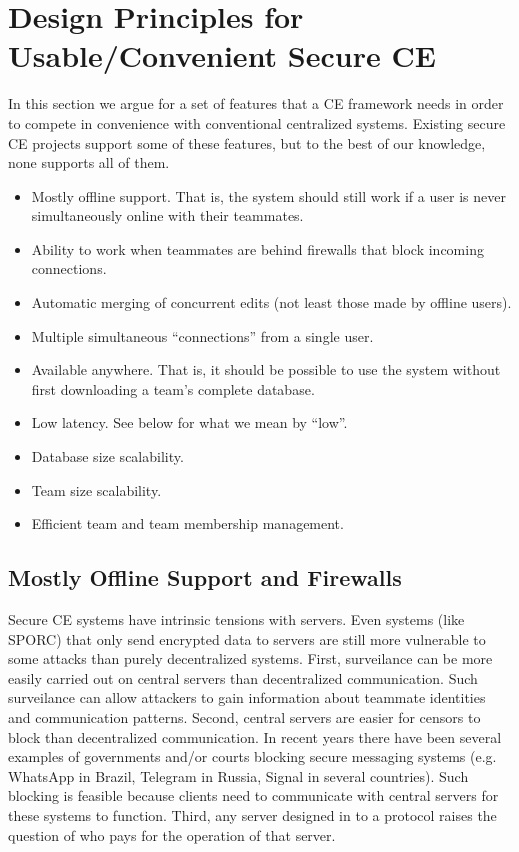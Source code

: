 \documentclass{article}
\begin{document}

\section{Design Principles for Usable/Convenient Secure CE}

In this section we argue for a set of features that a CE framework needs in order to compete in convenience with conventional centralized systems.
Existing secure CE projects support some of these features, but to the best of our knowledge, none supports all of them.

\begin{itemize}
\item Mostly offline support.
  That is, the system should still work if a user is never simultaneously online with their teammates.
\item Ability to work when teammates are behind firewalls that block incoming connections.
\item Automatic merging of concurrent edits (not least those made by offline users).
\item Multiple simultaneous ``connections'' from a single user.
\item Available anywhere.
  That is, it should be possible to use the system without first downloading a team's complete database.
\item Low latency.
  See below for what we mean by ``low''.
\item Database size scalability.
\item Team size scalability.
\item Efficient team and team membership management.
\end{itemize}

\subsection{Mostly Offline Support and Firewalls}

Secure CE systems have intrinsic tensions with servers.
Even systems (like SPORC) that only send encrypted data to servers are still more vulnerable to some attacks than purely decentralized systems.
First, surveilance can be more easily carried out on central servers than decentralized communication.
Such surveilance can allow attackers to gain information about teammate identities and communication patterns.
Second, central servers are easier for censors to block than decentralized communication.
In recent years there have been several examples of governments and/or courts blocking secure messaging systems (e.g. WhatsApp in Brazil, Telegram in Russia, Signal in several countries).
Such blocking is feasible because clients need to communicate with central servers for these systems to function.
Third, any server designed in to a protocol raises the question of who pays for the operation of that server.
\end{document}
